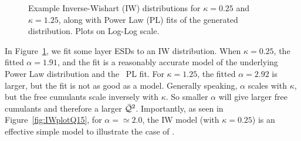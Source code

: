 \begin{figure}[h]
    \centering
      \caption{Example Inverse-Wishart (IW) distributions for $\kappa=0.25$ and $\kappa=1.25$,  along with Power Law (PL) fits of the generated distribution. Plots on Log-Log scale.}
  \label{fig:IWplots}                                                                                                      
\end{figure}   

In Figure~\ref{fig:IWplots}, we fit some \Typical layer ESDs to an IW distribution.
When $\kappa=0.25$, the fitted $\alpha=1.91$, and the fit is a reasonably accurate model of the underlying Power Law
distribution and the ~\WW PL fit.
For  $\kappa=1.25$, the fitted $\alpha=2.92$ is larger, but the fit is not as good as a
model. Generally speaking, $\alpha$ scales with $\kappa$, but the  free cumulants scale inversely with $\kappa$.
So smaller $\alpha$ will give larger free cumulants and therefore a larger $\bar{\mathcal{Q}}^{2}$.
Importantly, as seen in Figure~\ref{fig:IWplotQ15}, for $\alpha=\simeq 2.0$, the IW model (with $\kappa=0.25$)
is an effective simple model to illustrate the \SETOL case of \IdealLearning.

